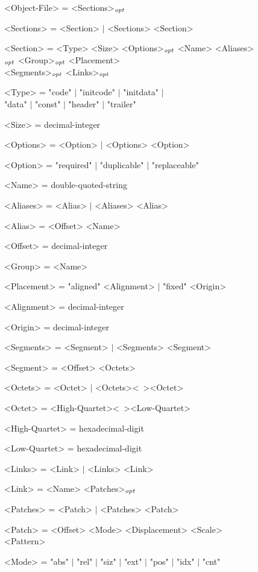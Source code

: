 \begin{figure}
\centering\ifbook\small\fi\setlength{\grammarparsep}{0ex}
\begin{minipage}{32em}\begin{grammar}
<Object-File> = <Sections>$_\mathit{opt}$ \par
<Sections> = <Section> $\mid$ <Sections> <Section> \par
<Section> = <Type> <Size> <Options>$_\mathit{opt}$ <Name> <Aliases>$_\mathit{opt}$ <Group>$_\mathit{opt}$ <Placement> \\ <Segments>$_\mathit{opt}$ <Links>$_\mathit{opt}$ \par
<Type> = "code" $\mid$ "initcode" $\mid$ "initdata" $\mid$ \\ "data" $\mid$ "const" $\mid$ "header" $\mid$ "trailer" \par
<Size> = decimal-integer \par
<Options> = <Option> $\mid$ <Options> <Option> \par
<Option> = "required" $\mid$ "duplicable" $\mid$ "replaceable" \par
<Name> = double-quoted-string \par
<Aliases> = <Alias> $\mid$ <Aliases> <Alias> \par
<Alias> = <Offset> <Name> \par
<Offset> = decimal-integer \par
<Group> = <Name> \par
<Placement> = "aligned" <Alignment> $\mid$ "fixed" <Origin> \par
<Alignment> = decimal-integer \par
<Origin> = decimal-integer \par
<Segments> = <Segment> $\mid$ <Segments> <Segment> \par
<Segment> = <Offset> <Octets> \par
<Octets> = <Octet> $\mid$ <Octets><\ ><Octet> \par
<Octet> = <High-Quartet><\ ><Low-Quartet> \par
<High-Quartet> = hexadecimal-digit \par
<Low-Quartet> = hexadecimal-digit \par
<Links> = <Link> $\mid$ <Links> <Link> \par
<Link> = <Name> <Patches>$_\mathit{opt}$ \par
<Patches> = <Patch> $\mid$ <Patches> <Patch> \par
<Patch> = <Offset> <Mode> <Displacement> <Scale> <Pattern> \par
<Mode> = "abs" $\mid$ "rel" $\mid$ "siz" $\mid$ "ext" $\mid$ "pos" $\mid$ "idx" $\mid$ "cnt" \par

\end{grammar}
\end{minipage}
\end{figure}
